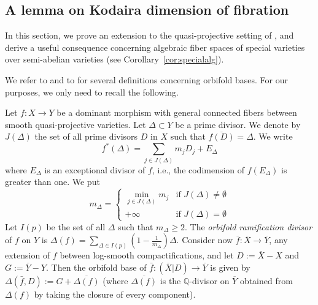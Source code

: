 \documentclass[11pt,english]{smfart}
\theoremstyle{plain}
\theoremstyle{definition}
\theoremstyle{remark}
\numberwithin{equation}{subsection}
\theoremstyle{plain}
\begin{document}
\subsection{A lemma on Kodaira dimension of fibration}
 In this section, we prove an extension to the quasi-projective setting of \cite[Theorem 1.8]{Cam04}, and derive a useful consequence concerning algebraic fiber spaces of special varieties over semi-abelian varieties (see Corollary~\ref{cor:specialalg}).

We refer to   and to \cite{Cam11} for several definitions concerning orbifold bases. For our purposes, we only need to recall the following.
\medskip

Let \(f : X \to Y\) be a dominant morphism with general connected fibers between smooth quasi-projective varieties. Let $\Delta \subset Y$ be a prime divisor. We denote by $J(\Delta )$ the set of all prime divisors $D$ in $X$ such that $\overline{f(D)}=\Delta$. 
We write 
\begin{equation}\label{eqn:div}
f^*(\Delta )=\sum_{j\in J(\Delta )}m_jD_j+E_{\Delta}
\end{equation}
where $E_{\Delta}$ is an exceptional divisor of $f$, i.e., the codimension of $f(E_{\Delta})$ is greater than one.
We put 
$$m_{\Delta}=
\begin{cases}
\min_{j\in J(\Delta )}m_j & \text{if $J(\Delta)\not=\emptyset$} \\
+\infty & \text{if $J(\Delta)=\emptyset$}
\end{cases}
$$
Let $I(p)$ be the set of all $\Delta$ such that $m_{\Delta}\geq 2$. The {\em orbifold ramification divisor} of \(f\) on \(Y\) is $\Delta (f)=\sum_{\Delta \in I(p)} \left( 1 - \frac{1}{m_{\Delta}} \right)\Delta$. Consider now \(\overline{f} : \overline{X} \to \overline{Y}\), any extension of \(f\) between log-smooth compactifications, and let \(D := \overline{X} - X\) and \(G := \overline{Y} - Y\). Then the orbifold base of \(\bar{f}: (\overline{X}| D)\to \overline{Y}\)   is given by \(\Delta(\bar{f}, D) := G + \overline{\Delta(f)}\) (where \(\overline{\Delta(f)}\) is the \(\mathbb{Q}\)-divisor on \(\overline{Y}\) obtained from \(\Delta(f)\) by taking the closure of every component). 
\end{document}
